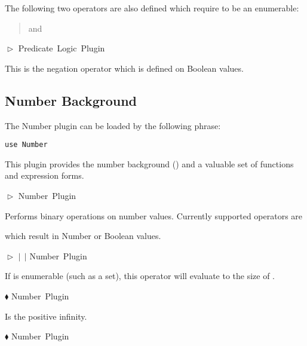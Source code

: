 \documentclass{article}
\newcommand{\funcform}[2]{\pform{$\blacklozenge$}{#1}{#2}}
\newcommand{\opform}[2]{\pform{$\vartriangleright$}{#1}{#2}}
\newcommand{\pform}[3]{\vspace*{4mm} \noindent #1 #2 \vspace{1mm}\textcolor[gray]{0.7}{\dotfill}\mbox{{\sffamily \footnotesize #3}}}
\begin{document}
\noindent The following two operators are also defined which require  to be an enumerable:

\begin{quote} and  \end{quote}

\opform{}{Predicate Logic Plugin}

This is the negation operator which is defined on Boolean values.



\subsection{Number Background}
\label{number}

The Number plugin can be loaded by the following  phrase:

\begin{lstlisting}
use Number
\end{lstlisting}
\noindent This plugin provides the number background () and
a valuable set of functions and expression forms. 

\opform{
}{Number Plugin}

Performs binary operations on number values. Currently supported operators are

\begin{quote}\end{quote}

which result in Number or Boolean values.

\opform{
	$|\:$$\:|$
}{Number Plugin}

If  is enumerable (such as a set), this operator will evaluate to the size of .

\funcform{
}{Number Plugin}

Is the positive infinity.

\funcform{
}{Number Plugin}
\end{document}

